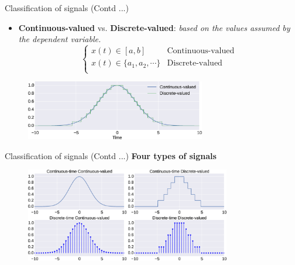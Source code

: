 \documentclass[aspectratio=169]{beamer}
\let\olditem\item
\renewcommand{\item}{\setlength{\itemsep}{\fill}\olditem}
\begin{document}
\begin{frame}{Classification of signals (Contd ...)}
\begin{itemize}
\item \textbf{Continuous-valued} vs. \textbf{Discrete-valued}: \textit{based on the values assumed by the dependent variable.}
\[
\begin{cases}
x(t) \in [a, b] & \text{Continuous-valued} \\
x(t) \in \{a_1, a_2, \cdots\} & \text{Discrete-valued} \\
\end{cases}
 \]
\end{itemize}
\begin{figure}
\includegraphics[width=0.7\textwidth]{img/cont_disc_val.eps}
\end{figure}
\end{frame}




\begin{frame}[t]
\end{frame}


\begin{frame}{Classification of signals (Contd ...)}
\textbf{Four types of signals}
\begin{figure}
\includegraphics[width=0.8\textwidth]{img/signal_types.eps}
\end{figure}
\end{frame}


\begin{frame}[t]
\end{frame}
\end{document}
